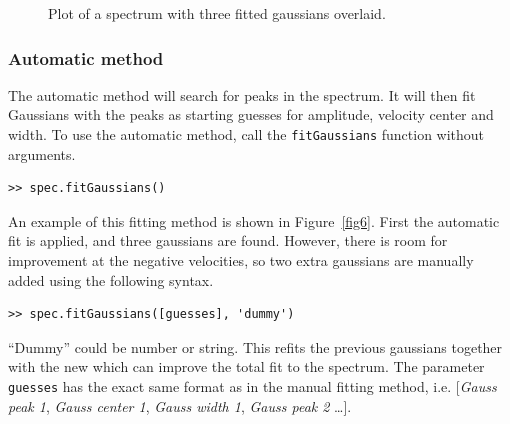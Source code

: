 \documentclass[11pt,a4paper]{article}
\begin{document}
\begin{figure}[h!]
  \centering
  \caption{Plot of a spectrum with three fitted gaussians overlaid.}
    \label{figGaussFit}
\end{figure}

\subsubsection{Automatic method}

The automatic method will search for peaks in the spectrum. It will
then fit Gaussians with the peaks as starting guesses for amplitude,
velocity center and width. To use the automatic method, call the
\texttt{fitGaussians} function without arguments.

\begin{lstlisting}
>> spec.fitGaussians()
\end{lstlisting}

An example of this fitting method is shown in Figure~\ref{fig6}. First
the automatic fit is applied, and three gaussians are found. However,
there is room for improvement at the negative velocities, so two extra
gaussians are manually added using the following syntax.

\begin{lstlisting}
>> spec.fitGaussians([guesses], 'dummy')
\end{lstlisting}

``Dummy'' could be number or string. This refits the previous
gaussians together with the new which can improve the total fit to the
spectrum. The parameter \texttt{guesses} has the exact same format as
in the manual fitting method, i.e. [\emph{Gauss peak 1}, \emph{Gauss
  center 1}, \emph{Gauss width 1}, \emph{Gauss peak 2} \ldots].
\end{document}
